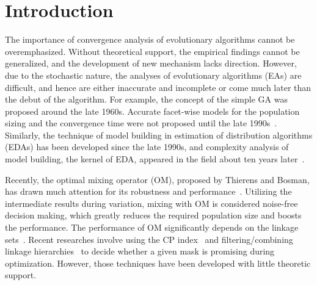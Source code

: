 \documentclass{sig-alternate}
\begin{document}


\section{Introduction}
\label{sec:introduction}

The importance of convergence analysis of evolutionary algorithms cannot be overemphasized.
Without theoretical support, the empirical findings cannot be generalized,
and the development of new mechanism lacks direction.
However, due to the stochastic nature, the analyses of evolutionary algorithms (EAs)  are difficult,
and hence are either inaccurate and incomplete or come much later than the debut of the algorithm.
For example, the concept of the simple GA was proposed around the late 1960s.
Accurate facet-wise models for the population sizing and the convergence time were not proposed until the late 1990s~\cite{1992_Goldberg, 1993_Thierens, 1993_BGA, 1999_Gamblers, 2001_Supply}.
Similarly, the technique of model building in estimation of distribution algorithms (EDAs) has been developed since the late 1990s,
and complexity analysis of model building, the kernel of EDA, appeared in the field about ten years later~\cite{2002_Pelikan, 2007_Yu}.

Recently, the optimal mixing operator (OM), proposed by Thierens and Bosman,
has drawn much attention for its robustness and performance~\cite{2012_LN_OM_FI, 2013_Hier}.
Utilizing the intermediate results during variation, mixing with OM is considered noise-free decision making, which greatly reduces the required population size and boosts the performance.
The performance of OM significantly depends on the linkage sets~\cite{2012_LN_OM_FI,2012_Goldman}.
Recent researches involve using the CP index~\cite{2014_CP} and filtering/combining linkage hierarchies~\cite{2013_Filtering} to decide whether a given mask is promising during optimization.
However, those techniques have been developed with little theoretic support.

\end{document}
